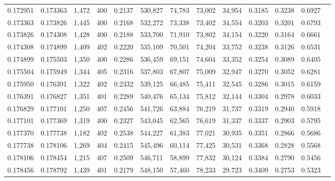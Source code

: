 \begin{tabular}{rrrrrrrrrrrrr}
0.172951 & 0.173363 & 1,472 & 400 &                                     0.2137 & 530,827 &  74,783 &  73,002 &  34,954 & 0.3185 & 0.3238 & 0.6927 \\
0.173363 & 0.173826 & 1,445 & 400 &                                     0.2168 & 532,272 &  73,338 &  73,402 &  34,554 & 0.3203 & 0.3201 & 0.6793 \\
0.173826 & 0.174308 & 1,428 & 400 &                                     0.2188 & 533,700 &  71,910 &  73,802 &  34,154 & 0.3220 & 0.3164 & 0.6661 \\
0.174308 & 0.174899 & 1,409 & 402 &                                     0.2220 & 535,109 &  70,501 &  74,204 &  33,752 & 0.3238 & 0.3126 & 0.6531 \\
0.174899 & 0.175503 & 1,350 & 400 &                                     0.2286 & 536,459 &  69,151 &  74,604 &  33,352 & 0.3254 & 0.3089 & 0.6405 \\
0.175504 & 0.175949 & 1,344 & 405 &                                     0.2316 & 537,803 &  67,807 &  75,009 &  32,947 & 0.3270 & 0.3052 & 0.6281 \\
0.175950 & 0.176391 & 1,322 & 402 &                                     0.2332 & 539,125 &  66,485 &  75,411 &  32,545 & 0.3286 & 0.3015 & 0.6159 \\
0.176391 & 0.176827 & 1,351 & 401 &                                     0.2289 & 540,476 &  65,134 &  75,812 &  32,144 & 0.3304 & 0.2978 & 0.6033 \\
0.176829 & 0.177101 & 1,250 & 407 &                                     0.2456 & 541,726 &  63,884 &  76,219 &  31,737 & 0.3319 & 0.2940 & 0.5918 \\
0.177101 & 0.177369 & 1,319 & 400 &                                     0.2327 & 543,045 &  62,565 &  76,619 &  31,337 & 0.3337 & 0.2903 & 0.5795 \\
0.177370 & 0.177738 & 1,182 & 402 &                                     0.2538 & 544,227 &  61,383 &  77,021 &  30,935 & 0.3351 & 0.2866 & 0.5686 \\
0.177738 & 0.178106 & 1,269 & 404 &                                     0.2415 & 545,496 &  60,114 &  77,425 &  30,531 & 0.3368 & 0.2828 & 0.5568 \\
0.178106 & 0.178454 & 1,215 & 407 &                                     0.2509 & 546,711 &  58,899 &  77,832 &  30,124 & 0.3384 & 0.2790 & 0.5456 \\
0.178456 & 0.178792 & 1,439 & 401 &                                     0.2179 & 548,150 &  57,460 &  78,233 &  29,723 & 0.3409 & 0.2753 & 0.5323 \\

\end{tabular}
